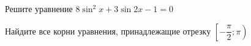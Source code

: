 \begin{ex}
	\begin{condition}
		\begin{enumcols}[label=\asbuk*)]
			\item Решите уравнение \( 8\sin^2 x + 3\sin 2x -1 =0 \)
			\item Найдите все корни уравнения, принадлежащие отрезку \( \left[-\dfrac{\pi}{2};\pi\right) \)
		\end{enumcols}
	\end{condition}
\end{ex}
